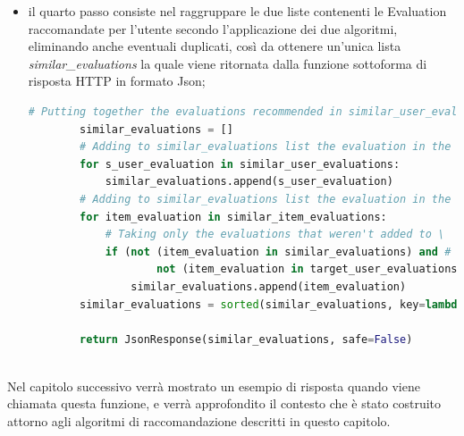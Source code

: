 \begin{itemize}
\begin{lstlisting}[language=Python, label=lst:CF_Hybrid_Evaluation_4]
				# in the recommendation) and same parent_id and the evaluations that weren't added to 'similar_item_evaluations'
				# list or to 'similar_user_evaluations' or to 'target_user_evaluations'
				if ((t_user_evaluation['other_id'] != item_evaluation['other_id']) and # Evaluations must have different 'id'
						(t_user_evaluation['parent_id'] == item_evaluation['parent_id']) and # Evaluations must have the same 'parent_id'
						# Evaluation in all_other_evals list mustn't be already added to \
						not (item_evaluation in similar_item_evaluations) and # the 'similar_item_evaluations' list,
						not (item_evaluation in similar_user_evaluations) and # the 'similar_user_evaluations' list or
						not (item_evaluation in target_user_evaluations)): # the 'target_user_evaluations' list
					similar_item_evaluations.append(item_evaluation)
	\end{lstlisting} 
	\item il quarto passo consiste nel raggruppare le due liste contenenti le Evaluation raccomandate per l'utente secondo l'applicazione dei
	due algoritmi, eliminando anche eventuali duplicati, così da ottenere un'unica lista \textit{similar\_evaluations} la quale viene ritornata dalla 
	funzione sottoforma di risposta HTTP in formato Json;
	\begin{lstlisting}[language=Python, label=lst:CF_Hybrid_Evaluation_5]
		# Putting together the evaluations recommended in similar_user_evaluations list and similar_item_evaluations list
		similar_evaluations = []
		# Adding to similar_evaluations list the evaluation in the similar_user_evaluations list
		for s_user_evaluation in similar_user_evaluations:
			similar_evaluations.append(s_user_evaluation)
		# Adding to similar_evaluations list the evaluation in the similar_item_evaluations list
		for item_evaluation in similar_item_evaluations:
			# Taking only the evaluations that weren't added to \
			if (not (item_evaluation in similar_evaluations) and # the 'similar_evaluations' list or
					not (item_evaluation in target_user_evaluations)): # the 'target_user_evaluations' list
				similar_evaluations.append(item_evaluation)
		similar_evaluations = sorted(similar_evaluations, key=lambda i: i['other_id'])

		return JsonResponse(similar_evaluations, safe=False)
	\end{lstlisting} 
\end{itemize}
\ \\
Nel capitolo successivo verrà mostrato un esempio di risposta quando viene chiamata questa funzione, e verrà approfondito il contesto che 
è stato costruito attorno agli algoritmi di raccomandazione descritti in questo capitolo.

